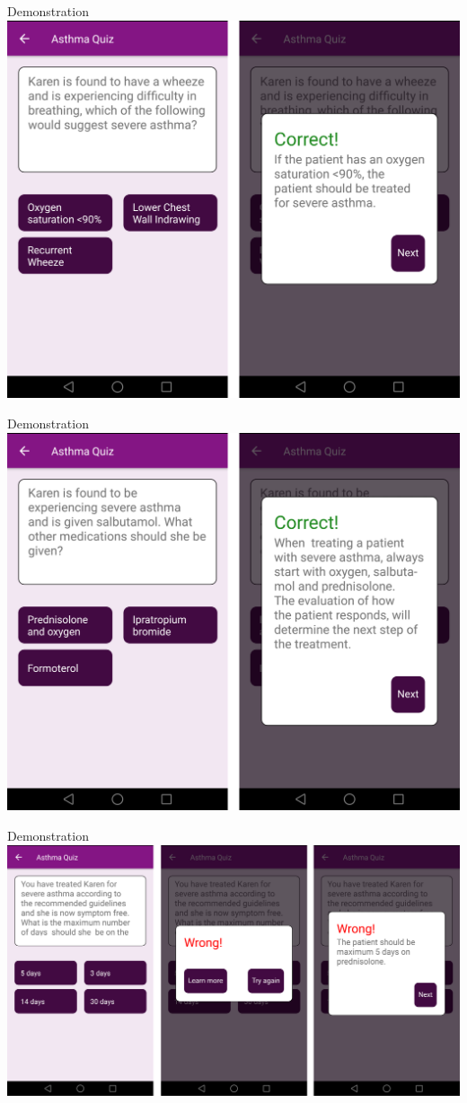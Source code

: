 \documentclass{beamer}
\begin{document}
\begin{frame}{Demonstration}
\includegraphics[scale=0.16]{Montage3}
\end{frame}
\begin{frame}{Demonstration}
\includegraphics[scale=0.16]{Montage4}
\end{frame}
\begin{frame}{Demonstration}
\includegraphics[scale=0.14]{Montage5}
\end{frame}
\end{document}

